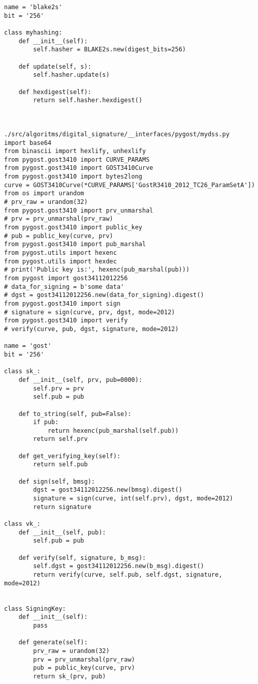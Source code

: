 \begin{lstlisting}
name = 'blake2s'
bit = '256'

class myhashing:
    def __init__(self):
        self.hasher = BLAKE2s.new(digest_bits=256)

    def update(self, s):
        self.hasher.update(s)

    def hexdigest(self):
        return self.hasher.hexdigest()



./src/algoritms/digital_signature/__interfaces/pygost/mydss.py
import base64
from binascii import hexlify, unhexlify
from pygost.gost3410 import CURVE_PARAMS
from pygost.gost3410 import GOST3410Curve
from pygost.gost3410 import bytes2long
curve = GOST3410Curve(*CURVE_PARAMS['GostR3410_2012_TC26_ParamSetA'])
from os import urandom
# prv_raw = urandom(32)
from pygost.gost3410 import prv_unmarshal
# prv = prv_unmarshal(prv_raw)
from pygost.gost3410 import public_key
# pub = public_key(curve, prv)
from pygost.gost3410 import pub_marshal
from pygost.utils import hexenc
from pygost.utils import hexdec
# print('Public key is:', hexenc(pub_marshal(pub)))
from pygost import gost34112012256
# data_for_signing = b'some data'
# dgst = gost34112012256.new(data_for_signing).digest()
from pygost.gost3410 import sign
# signature = sign(curve, prv, dgst, mode=2012)
from pygost.gost3410 import verify
# verify(curve, pub, dgst, signature, mode=2012)

name = 'gost'
bit = '256'

class sk_:
    def __init__(self, prv, pub=0000):
        self.prv = prv
        self.pub = pub

    def to_string(self, pub=False):
        if pub:
            return hexenc(pub_marshal(self.pub))
        return self.prv

    def get_verifying_key(self):
        return self.pub

    def sign(self, bmsg):
        dgst = gost34112012256.new(bmsg).digest()
        signature = sign(curve, int(self.prv), dgst, mode=2012)
        return signature

class vk_:
    def __init__(self, pub):
        self.pub = pub

    def verify(self, signature, b_msg):
        self.dgst = gost34112012256.new(b_msg).digest()
        return verify(curve, self.pub, self.dgst, signature, mode=2012)


class SigningKey:
    def __init__(self):
        pass

    def generate(self):
        prv_raw = urandom(32)
        prv = prv_unmarshal(prv_raw)
        pub = public_key(curve, prv)
        return sk_(prv, pub)


\end{lstlisting}
